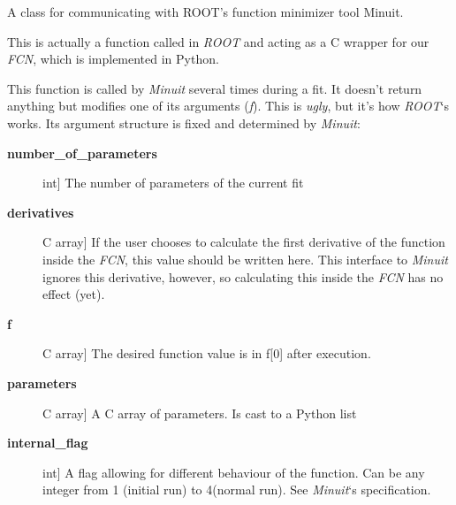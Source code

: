 \documentclass[a4paper,10pt,english]{sphinxmanual}
\begin{document}
\begin{fulllineitems}
\label{module_doc:kafe.minuit.Minuit}
A class for communicating with ROOT's function minimizer tool Minuit.

\begin{fulllineitems}
\label{module_doc:kafe.minuit.Minuit.FCN_wrapper}
This is actually a function called in \emph{ROOT} and acting as a C wrapper
for our \emph{FCN}, which is implemented in Python.

This function is called by \emph{Minuit} several times during a fit. It
doesn't return anything but modifies one of its arguments (\emph{f}).
This is \emph{ugly}, but it's how \emph{ROOT}`s  works. Its argument
structure is fixed and determined by \emph{Minuit}:
\begin{description}
\item[{\textbf{number\_of\_parameters}}] \leavevmode{[}int{]}
The number of parameters of the current fit

\item[{\textbf{derivatives}}] \leavevmode{[}C array{]}
If the user chooses to calculate the first derivative of the
function inside the \emph{FCN}, this value should be written here. This
interface to \emph{Minuit} ignores this derivative, however, so
calculating this inside the \emph{FCN} has no effect (yet).

\item[{\textbf{f}}] \leavevmode{[}C array{]}
The desired function value is in f{[}0{]} after execution.

\item[{\textbf{parameters}}] \leavevmode{[}C array{]}
A C array of parameters. Is cast to a Python list

\item[{\textbf{internal\_flag}}] \leavevmode{[}int{]}
A flag allowing for different behaviour of the function.
Can be any integer from 1 (initial run) to 4(normal run). See
\emph{Minuit}`s specification.

\end{description}


\end{fulllineitems}
\end{fulllineitems}
\end{document}
